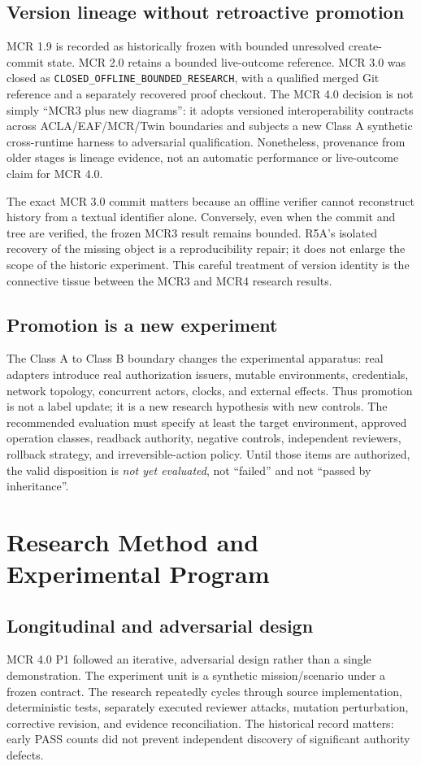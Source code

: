 \documentclass[11pt,twocolumn]{article}
\newcommand{\code}[1]{\texttt{#1}}
\begin{document}
\subsection{Version lineage without retroactive promotion}
MCR 1.9 is recorded as historically frozen with bounded unresolved create-commit state. MCR 2.0 retains a bounded live-outcome reference. MCR 3.0 was closed as \code{CLOSED\_\allowbreak OFFLINE\_\allowbreak BOUNDED\_\allowbreak RESEARCH}, with a qualified merged Git reference and a separately recovered proof checkout. The MCR 4.0 decision is not simply ``MCR3 plus new diagrams'': it adopts versioned interoperability contracts across ACLA/EAF/MCR/Twin boundaries and subjects a new Class A synthetic cross-runtime harness to adversarial qualification. Nonetheless, provenance from older stages is lineage evidence, not an automatic performance or live-outcome claim for MCR 4.0.

The exact MCR 3.0 commit matters because an offline verifier cannot reconstruct history from a textual identifier alone. Conversely, even when the commit and tree are verified, the frozen MCR3 result remains bounded. R5A's isolated recovery of the missing object is a reproducibility repair; it does not enlarge the scope of the historic experiment. This careful treatment of version identity is the connective tissue between the MCR3 and MCR4 research results.

\subsection{Promotion is a new experiment}
The Class A to Class B boundary changes the experimental apparatus: real adapters introduce real authorization issuers, mutable environments, credentials, network topology, concurrent actors, clocks, and external effects. Thus promotion is not a label update; it is a new research hypothesis with new controls. The recommended evaluation must specify at least the target environment, approved operation classes, readback authority, negative controls, independent reviewers, rollback strategy, and irreversible-action policy. Until those items are authorized, the valid disposition is \emph{not yet evaluated}, not ``failed'' and not ``passed by inheritance''.


\section{Research Method and Experimental Program}
\subsection{Longitudinal and adversarial design}
MCR 4.0 P1 followed an iterative, adversarial design rather than a single demonstration. The experiment unit is a synthetic mission/scenario under a frozen contract. The research repeatedly cycles through source implementation, deterministic tests, separately executed reviewer attacks, mutation perturbation, corrective revision, and evidence reconciliation. The historical record matters: early PASS counts did not prevent independent discovery of significant authority defects.
\end{document}

